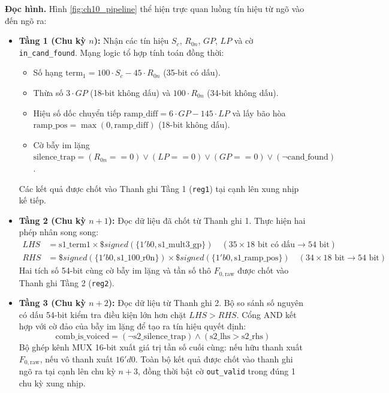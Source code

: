 \textbf{Đọc hình.} Hình \ref{fig:ch10_pipeline} thể hiện trực quan luồng tín hiệu từ ngõ vào đến ngõ ra:
\begin{itemize}
    \item \textbf{Tầng 1 (Chu kỳ $n$):} Nhận các tín hiệu $S_c$, $R_{0n}$, $GP$, $LP$ và cờ \texttt{in\_cand\_found}. Mạng logic tổ hợp tính toán đồng thời:
    \begin{itemize}
        \item Số hạng $\text{term}_1 = 100 \cdot S_c - 45 \cdot R_{0n}$ (35-bit có dấu).
        \item Thừa số $3 \cdot GP$ (18-bit không dấu) và $100 \cdot R_{0n}$ (34-bit không dấu).
        \item Hiệu số dốc chuyển tiếp $\text{ramp\_diff} = 6 \cdot GP - 145 \cdot LP$ và lấy bão hòa $\text{ramp\_pos} = \max(0, \text{ramp\_diff})$ (18-bit không dấu).
        \item Cờ bẫy im lặng $\text{silence\_trap} = (R_{0n} == 0) \lor (LP == 0) \lor (GP == 0) \lor (\neg \text{cand\_found})$.
    \end{itemize}
    Các kết quả được chốt vào Thanh ghi Tầng 1 (\texttt{reg1}) tại cạnh lên xung nhịp kế tiếp.
    \item \textbf{Tầng 2 (Chu kỳ $n+1$):} Đọc dữ liệu đã chốt từ Thanh ghi 1. Thực hiện hai phép nhân song song:
    \begin{align}
        LHS &= \text{s1\_term1} \times \$signed(\{1'b0, \text{s1\_mult3\_gp}\}) \quad (35 \times 18\text{ bit có dấu} \to 54\text{ bit}) \\
        RHS &= \$signed(\{1'b0, \text{s1\_100\_r0n}\}) \times \$signed(\{1'b0, \text{s1\_ramp\_pos}\}) \quad (34 \times 18\text{ bit} \to 54\text{ bit})
    \end{align}
    Hai tích số 54-bit cùng cờ bẫy im lặng và tần số thô $F_{0,\text{raw}}$ được chốt vào Thanh ghi Tầng 2 (\texttt{reg2}).
    \item \textbf{Tầng 3 (Chu kỳ $n+2$):} Đọc dữ liệu từ Thanh ghi 2. Bộ so sánh số nguyên có dấu 54-bit kiểm tra điều kiện lớn hơn chặt $LHS > RHS$. Cổng AND kết hợp với cờ đảo của bẫy im lặng để tạo ra tín hiệu quyết định:
    \begin{equation*}
        \text{comb\_is\_voiced} = (\neg \text{s2\_silence\_trap}) \land (\text{s2\_lhs} > \text{s2\_rhs})
    \end{equation*}
    Bộ ghép kênh MUX 16-bit xuất giá trị tần số cuối cùng: nếu hữu thanh xuất $F_{0,\text{raw}}$, nếu vô thanh xuất $16'd0$. Toàn bộ kết quả được chốt vào thanh ghi ngõ ra tại cạnh lên chu kỳ $n+3$, đồng thời bật cờ \texttt{out\_valid} trong đúng 1 chu kỳ xung nhịp.
\end{itemize}

